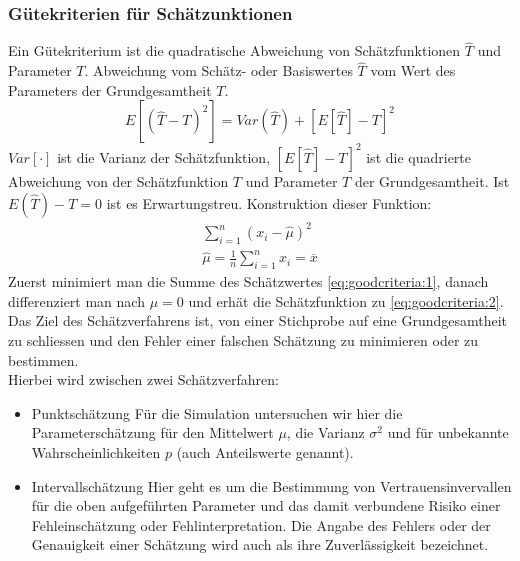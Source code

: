 \subsubsection{Gütekriterien für Schätzunktionen}
Ein Gütekriterium ist die quadratische Abweichung von Schätzfunktionen $\widehat{T}$ und Parameter $T$. Abweichung vom Schätz- oder Basiswertes $\widehat{T}$ vom Wert des Parameters der Grundgesamtheit $T$.
\begin{equation}
E[(\widehat{T}-T)^2] = Var(\widehat{T}) + [E[\widehat{T}]-T]^2
\end{equation}
$Var[\cdot]$ ist die Varianz der Schätzfunktion, $[E[\widehat{T}]-T]^2$ ist die quadrierte Abweichung von der Schätzfunktion $T$ und Parameter $T$ der Grundgesamtheit. Ist $E(\widehat{T})-T=0$ ist es Erwartungstreu.
Konstruktion dieser Funktion:
\begin{align}
\sum_{i=1}^n(x_i-\widehat{\mu})^2 \label{eq:goodcriteria:1} \\
\widehat{\mu}=\frac{1}{n}\sum_{i=1}^n x_i = \overline{x} \label{eq:goodcriteria:2}
\end{align}
Zuerst minimiert man die Summe des Schätzwertes \autoref{eq:goodcriteria:1}, danach differenziert man nach $\mu = 0$ und erhät die Schätzfunktion zu \autoref{eq:goodcriteria:2}. \\
Das Ziel des Schätzverfahrens ist, von einer Stichprobe auf eine Grundgesamtheit zu schliessen und den Fehler einer falschen Schätzung zu minimieren oder zu bestimmen.\\
Hierbei wird zwischen zwei Schätzverfahren:
\begin{itemize}
\item Punktschätzung
\subitem Für die Simulation untersuchen wir hier die Parameterschätzung für den Mittelwert $\mu$, die Varianz $\sigma^2$ und für unbekannte Wahrscheinlichkeiten $p$ (auch Anteilswerte genannt).
\nopagebreak[4]
\item Intervallschätzung
\subitem Hier geht es um die Bestimmung von Vertrauensinvervallen für die oben aufgeführten Parameter und das damit verbundene Risiko einer Fehleinschätzung oder Fehlinterpretation. Die Angabe des Fehlers oder der Genauigkeit einer Schätzung wird auch als ihre Zuverlässigkeit bezeichnet.
\end{itemize}

